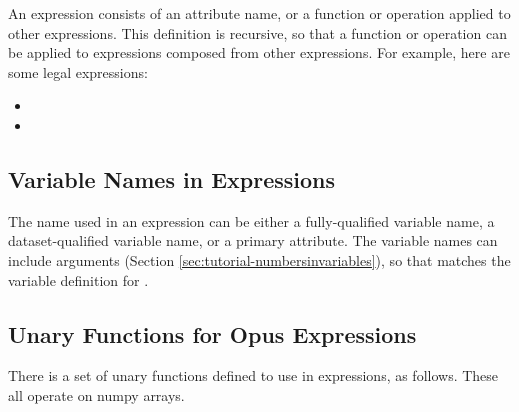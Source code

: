 An expression consists of an attribute name, or a function or operation
applied to other expressions.  This definition is recursive, so that a
function or operation can be applied to expressions composed
from other expressions.  For example, here are some legal expressions:

\begin{itemize}

\item {}
\item {}

\end{itemize}

\subsection{Variable Names in Expressions}

The name used in an expression can be either a fully-qualified variable
name, a dataset-qualified variable name, or a primary attribute.
The variable names can include arguments (Section
\ref{sec:tutorial-numbersinvariables}), 
so that
 matches the variable definition
for .

\subsection{Unary Functions for Opus Expressions}
\label{sec:functions-for-opus-expressions}

There is a set of unary functions defined to use in expressions, as
follows.  These all operate on numpy arrays.

